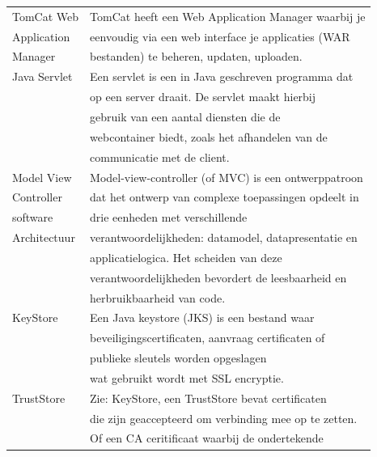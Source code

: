 \documentclass[]{article}
\begin{document}
\begin{longtable}{|| l | l ||}
    TomCat Web       & TomCat heeft een Web Application Manager waarbij je  \\
    Application      & eenvoudig via een web interface je applicaties (WAR  \\
    Manager          & bestanden) te beheren, updaten, uploaden.            \\\hline
    Java Servlet     & Een servlet is een in Java geschreven programma dat  \\
                     & op een server draait. De servlet maakt hierbij       \\
                     & gebruik van een aantal diensten die de               \\
                     & webcontainer biedt, zoals het afhandelen van de      \\
                     & communicatie met de client.                          \\\hline
    Model View       & Model-view-controller (of MVC) is een ontwerppatroon \\
    Controller       & dat het ontwerp van complexe toepassingen opdeelt in \\
    software         & drie eenheden met verschillende                      \\
    Architectuur     & verantwoordelijkheden: datamodel, datapresentatie en \\
                     & applicatielogica. Het scheiden van deze              \\
                     & verantwoordelijkheden bevordert de leesbaarheid en   \\
                     & herbruikbaarheid van code.                           \\\hline
    KeyStore         & Een Java keystore (JKS) is een bestand waar          \\
                     & beveiligingscertificaten, aanvraag certificaten of   \\
                     & publieke sleutels worden opgeslagen                  \\
                     & wat gebruikt wordt met SSL encryptie.                \\\hline
    TrustStore       & Zie: KeyStore, een TrustStore bevat certificaten     \\
                     & die zijn geaccepteerd om verbinding mee op te zetten.\\
                     & Of een CA ceritificaat waarbij de ondertekende       \\

\end{longtable}
\end{document}
